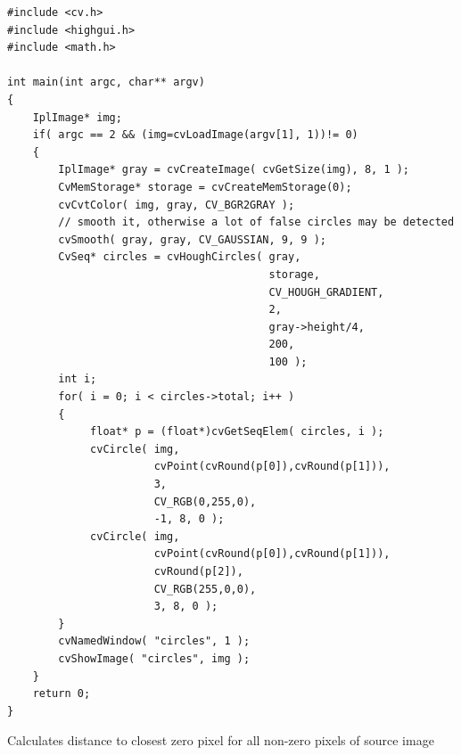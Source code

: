 \begin{lstlisting}
#include <cv.h>
#include <highgui.h>
#include <math.h>

int main(int argc, char** argv)
{
    IplImage* img;
    if( argc == 2 && (img=cvLoadImage(argv[1], 1))!= 0)
    {
        IplImage* gray = cvCreateImage( cvGetSize(img), 8, 1 );
        CvMemStorage* storage = cvCreateMemStorage(0);
        cvCvtColor( img, gray, CV_BGR2GRAY );
        // smooth it, otherwise a lot of false circles may be detected
        cvSmooth( gray, gray, CV_GAUSSIAN, 9, 9 );
        CvSeq* circles = cvHoughCircles( gray,
                                         storage,
                                         CV_HOUGH_GRADIENT,
                                         2,
                                         gray->height/4,
                                         200,
                                         100 );
        int i;
        for( i = 0; i < circles->total; i++ )
        {
             float* p = (float*)cvGetSeqElem( circles, i );
             cvCircle( img,
                       cvPoint(cvRound(p[0]),cvRound(p[1])),
                       3,
                       CV_RGB(0,255,0),
                       -1, 8, 0 );
             cvCircle( img,
                       cvPoint(cvRound(p[0]),cvRound(p[1])),
                       cvRound(p[2]),
                       CV_RGB(255,0,0),
                       3, 8, 0 );
        }
        cvNamedWindow( "circles", 1 );
        cvShowImage( "circles", img );
    }
    return 0;
}
\end{lstlisting}

\label{DistTransform}

Calculates distance to closest zero pixel for all non-zero pixels of source image


